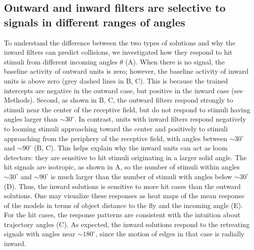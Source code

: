 \documentclass[pdftex,9pt,lineno]{elife}
\begin{document}
\subsection{Outward and inward filters are selective to signals in different ranges of angles}

To understand the difference between the two types of solutions and why the inward filters can predict collisions, we investigated how they respond to hit stimuli from different incoming angles $\theta$ (A). When there is no signal, the baseline activity of outward units is zero; however, the baseline activity of inward units is above zero (grey dashed lines in B, C). This is because the trained intercepts are negative in the outward case, but positive in the inward case (see Methods). Second, as shown in B, C, the outward filters respond strongly to stimuli near the center of the receptive field, but do not respond to stimuli having angles larger than $\sim 30^{\circ}$. In contrast, units with inward filters respond negatively to looming stimuli approaching toward the center and positively to stimuli approaching from the periphery of the receptive field, with angles between $\sim 30^{\circ}$ and $\sim 90^{\circ}$ (B, C). This helps explain why the inward units can act as loom detectors: they are sensitive to hit stimuli originating in a larger solid angle. The hit signals are isotropic, as shown in A, so the number of stimuli within angles $\sim 30^{\circ}$ and $\sim 90^{\circ}$ is much larger than the number of stimuli with angles below $\sim 30^{\circ}$ (D). Thus, the inward solutions is sensitive to more hit cases than the outward solutions. One may visualize these responses as heat maps of the mean response of the models in terms of object distance to the fly and the incoming angle (E). For the hit cases, the response patterns are consistent with the intuition about trajectory angles (C). As expected, the inward solutions respond to the retreating signals with angles near $\sim 180^{\circ}$, since the motion of edges in that case is radially inward.
\end{document}
